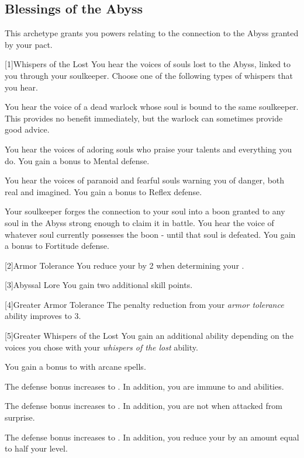     \subsection{Blessings of the Abyss}
        This archetype grants you powers relating to the connection to the Abyss granted by your pact.

        [1]{Whispers of the Lost} You hear the voices of souls lost to the Abyss, linked to you through your soulkeeper.
        Choose one of the following types of whispers that you hear.
        {
             You hear the voice of a dead warlock whose soul is bound to the same soulkeeper.
            This provides no benefit immediately, but the warlock can sometimes provide good advice.

             You hear the voices of adoring souls who praise your talents and everything you do.
            You gain a  bonus to Mental defense.

             You hear the voices of paranoid and fearful souls warning you of danger, both real and imagined.
            You gain a  bonus to Reflex defense.

             Your soulkeeper forges the connection to your soul into a boon granted to any soul in the Abyss strong enough to claim it in battle.
            You hear the voice of whatever soul currently possesses the boon - until that soul is defeated.
            You gain a  bonus to Fortitude defense.
        }

        [2]{Armor Tolerance} You reduce your  by 2 when determining your .

        [3]{Abyssal Lore} You gain two additional skill points.

        [4]{Greater Armor Tolerance} The penalty reduction from your \textit{armor tolerance} ability improves to 3.

        [5]{Greater Whispers of the Lost} You gain an additional ability depending on the voices you chose with your \textit{whispers of the lost} ability.
        {
             You gain a  bonus to  with arcane spells.

             The defense bonus increases to .
            In addition, you are immune to  and  abilities.

             The defense bonus increases to .
            In addition, you are not  when attacked from surprise.

             The defense bonus increases to .
            In addition, you reduce your  by an amount equal to half your level.
        }

